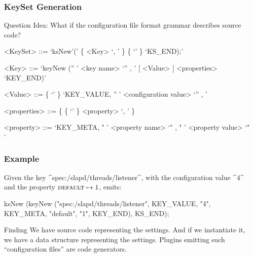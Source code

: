 \begin{frame}[fragile]
	\frametitle{KeySet Generation}
	\begin{alertblock}{Question}
	Idea: What if the configuration file format grammar describes source code?
	\end{alertblock}
	\pause

	\begin{grammar}
	<KeySet> ::= \lq ksNew'\WhiteSpace(' \{ <Key> \lq , \LineBreak'  \}  \{ \lq\WhiteSpace' \} \lq KS\_END);'

	<Key> ::= \lq keyNew \WhiteSpace ('' ' <key name> \lq ''  , \LineBreak' [ <Value> ] <properties> \lq KEY_END)'

	<Value> ::=  \{ \lq\WhiteSpace' \} \lq KEY\_VALUE, \WhiteSpace '' ' <configuration value> \lq ''  , \LineBreak'

	<properties> ::= \{ \{ \lq\WhiteSpace' \} <property> \lq , \LineBreak' \}

	<property> ::=  \lq KEY\_META, \WhiteSpace " ' <property name> \lq "  , \WhiteSpace " ' <property value> \lq " '
	\end{grammar}
\end{frame}

\begin{frame}[fragile]
	\frametitle{Example}
	\begin{example}
	Given the key ^spec:/slapd/threads/listener^, with the configuration value ^4^ and the property ${\textsc{default}} \mapsto 1$,  emits:

	\begin{code}[gobble=4,language=Cpp]
	ksNew (keyNew ("spec:/slapd/threads/listener",
		       KEY_VALUE, "4",
		       KEY_META, "default", "1",
		       KEY_END),
	       KS_END);
	\end{code}
	\vspace{-1em}
	\end{example}

	\pause
	\begin{alertblock}{Finding}
	We have source code representing the settings.
	And if we instantiate it, we have a data structure representing the settings.
	Plugins emitting such ``configuration files'' are code generators.
	\end{alertblock}
\end{frame}

